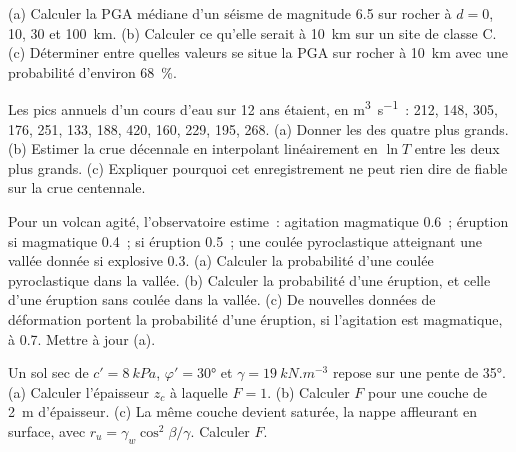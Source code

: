 \begin{exercise}[$\star\star$]\label{exo:b2:geological-hazards:6}
(a) Calculer la PGA médiane d'un séisme de magnitude 6.5 sur rocher à $d = 0$, 10, 30 et \qty{100}{km}.
(b) Calculer ce qu'elle serait à \qty{10}{km} sur un site de classe C. (c) Déterminer entre quelles
valeurs se situe la PGA sur rocher à \qty{10}{km} avec une probabilité d'environ \qty{68}{\percent}.
\end{exercise}

\begin{exercise}[$\star\star$]\label{exo:b2:geological-hazards:7}
Les pics annuels d'un cours d'eau sur 12 ans étaient, en \unit{m^3.s^{-1}}~: 212, 148, 305, 176,
251, 133, 188, 420, 160, 229, 195, 268. (a) Donner les  des quatre plus grands.
(b) Estimer la crue décennale en interpolant linéairement en $\ln T$ entre les deux plus grands.
(c) Expliquer pourquoi cet enregistrement ne peut rien dire de fiable sur la crue centennale.
\end{exercise}

\begin{exercise}[$\star\star$]\label{exo:b2:geological-hazards:8}
Pour un volcan agité, l'observatoire estime~: agitation magmatique 0.6~; éruption si magmatique 0.4~;
 si éruption 0.5~; une coulée pyroclastique atteignant une vallée donnée si explosive
0.3. (a) Calculer la probabilité d'une coulée pyroclastique dans la vallée. (b) Calculer la probabilité
d'une éruption, et celle d'une éruption sans coulée dans la vallée. (c) De nouvelles données de
déformation portent la probabilité d'une éruption, si l'agitation est magmatique, à 0.7. Mettre à jour (a).
\end{exercise}

\begin{exercise}[$\star\star$]\label{exo:b2:geological-hazards:9}
Un sol sec de $c' = \qty{8}{kPa}$, $\varphi' = \ang{30}$ et $\gamma = \qty{19}{kN.m^{-3}}$
repose sur une pente de \ang{35}. (a) Calculer l'épaisseur $z_c$ à laquelle $F = 1$. (b)
Calculer $F$ pour une couche de \qty{2}{m} d'épaisseur. (c) La même couche devient saturée,
la nappe affleurant en surface, avec $r_u = \gamma_w\cos^2\beta/\gamma$. Calculer $F$.
\end{exercise}

